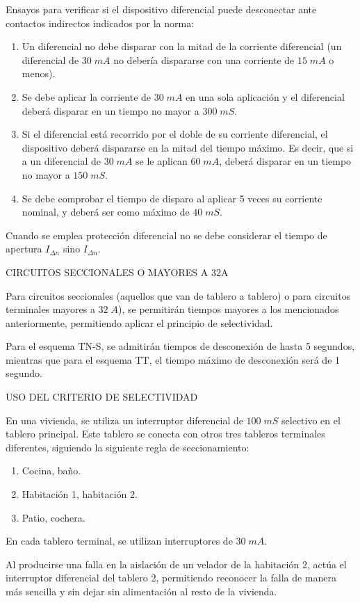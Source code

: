 Ensayos para verificar si el dispositivo diferencial puede desconectar ante contactos indirectos indicados por la norma:
\begin{enumerate}
	\item Un diferencial no debe disparar con la mitad de la corriente diferencial (un diferencial de $30\; mA$ no debería dispararse con una corriente de $15\; mA$ o menos).
	\item Se debe aplicar la corriente de $30\; mA$ en una sola aplicación y el diferencial deberá disparar en un tiempo no mayor a $300\; mS$.
	\item Si el diferencial está recorrido por el doble de su corriente diferencial, el dispositivo deberá dispararse en la mitad del tiempo máximo. Es decir, que si a un diferencial de $30\; mA$ se le aplican $60\; mA$, deberá disparar en un tiempo no mayor a $150\; mS$.
	\item Se debe comprobar el tiempo de disparo al aplicar 5 veces su corriente nominal, y deberá ser como máximo de $40\; mS$.
\end{enumerate}

Cuando se emplea protección diferencial no se debe considerar el tiempo de apertura $I_{\Delta n}$ sino $I_{\Delta n}$.

CIRCUITOS SECCIONALES O MAYORES A 32A

Para circuitos seccionales (aquellos que van de tablero a tablero) o para circuitos terminales mayores a $32\; A$), se permitirán tiempos mayores a los mencionados anteriormente, permitiendo aplicar el principio de selectividad.

Para el esquema TN-S, se admitirán tiempos de desconexión de hasta 5 segundos, mientras que para el esquema TT, el tiempo máximo de desconexión será de 1 segundo.

USO DEL CRITERIO DE SELECTIVIDAD
\begin{ejemplo}
	En una vivienda, se utiliza un interruptor diferencial de $100\; mS$ selectivo en el tablero principal. Este tablero se conecta con otros tres tableros terminales diferentes, siguiendo la siguiente regla de seccionamiento:
	\begin{enumerate}
		\item Cocina, baño.
		\item Habitación 1, habitación 2.
		\item Patio, cochera.
	\end{enumerate}
 	En cada tablero terminal, se utilizan interruptores de $30\; mA$.
 	
 	Al producirse una falla en la aislación de un velador de la habitación 2, actúa el interruptor diferencial del tablero 2, permitiendo reconocer la falla de manera más sencilla y sin dejar sin alimentación al resto de la vivienda.
\end{ejemplo}


